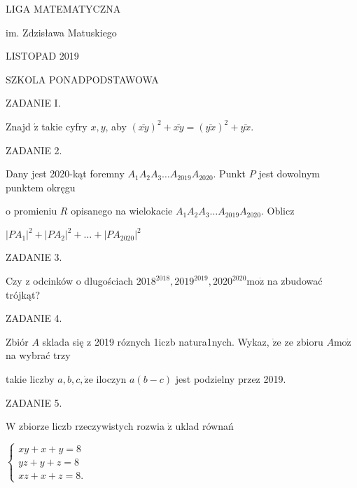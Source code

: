 \documentclass[a4paper,12pt]{article}
\begin{document}
LIGA MATEMATYCZNA

im. Zdzisława Matuskiego

LISTOPAD 2019

SZKOLA PONADPODSTAWOWA

ZADANIE I.

Znajd $\acute{\mathrm{z}}$ takie cyfry $x, y$, aby $(\overline{xy})^{2}+\overline{xy}=(\overline{yx})^{2}+\overline{yx}.$

ZADANIE 2.

Dany jest 2020-kąt foremny $A_{1}A_{2}A_{3}\ldots A_{2019}A_{2020}$. Punkt $P$ jest dowolnym punktem okręgu

o promieniu $R$ opisanego na wielokacie $A_{1}A_{2}A_{3}\ldots A_{2019}A_{2020}$. Oblicz

$|PA_{1}|^{2}+|PA_{2}|^{2}+\ldots+|PA_{2020}|^{2}$

ZADANIE 3.

Czy z odcinków o dlugościach $2018^{2018}, 2019^{2019}, 2020^{2020}\mathrm{m}\mathrm{o}\dot{\mathrm{z}}$ na zbudować trójkąt?

ZADANIE 4.

Zbiór $A$ sklada się z 2019 róznych 1iczb natura1nych. Wykaz, $\dot{\mathrm{z}}\mathrm{e}$ ze zbioru $A\mathrm{m}\mathrm{o}\dot{\mathrm{z}}$ na wybrać trzy

takie liczby $a, b, c, \dot{\mathrm{z}}\mathrm{e}$ iloczyn $a(b-c)$ jest podzielny przez 2019.

ZADANIE 5.

$\mathrm{W}$ zbiorze liczb rzeczywistych rozwia $\dot{\mathrm{z}}$ uklad równań

$\left\{\begin{array}{l}
xy+x+y=8\\
yz+y+z=8\\
xz+x+z=8.
\end{array}\right.$
\end{document}
